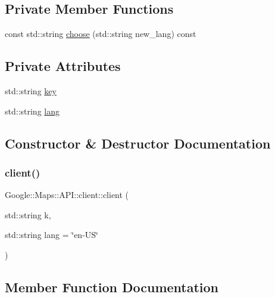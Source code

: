 \subsection*{Private Member Functions}
\begin{DoxyCompactItemize}
\item 
const std\+::string \hyperlink{a00047_ab9af6c85cf06cff7e2e877c7ed1db179}{choose} (std\+::string new\+\_\+lang) const
\end{DoxyCompactItemize}
\subsection*{Private Attributes}
\begin{DoxyCompactItemize}
\item 
std\+::string \hyperlink{a00047_a81829bbeb30b8931e2929a3d9815045b}{key}
\item 
std\+::string \hyperlink{a00047_a4854d3b172e3e823b647897fe8b24f44}{lang}
\end{DoxyCompactItemize}


\subsection{Constructor \& Destructor Documentation}
\mbox{\label{a00047_aa4e453192444e3ed3ae486036e852f03}} 
\subsubsection{\texorpdfstring{client()}{client()}}
{\footnotesize\ttfamily Google\+::\+Maps\+::\+A\+P\+I\+::client\+::client (\begin{DoxyParamCaption}\item[{std\+::string}]{k,  }\item[{std\+::string}]{lang = {\ttfamily \char`\"{}en-\/US\char`\"{}} }\end{DoxyParamCaption})\hspace{0.3cm}{\ttfamily [inline]}}



\subsection{Member Function Documentation}
\mbox{\label{a00047_ab9af6c85cf06cff7e2e877c7ed1db179}} 

